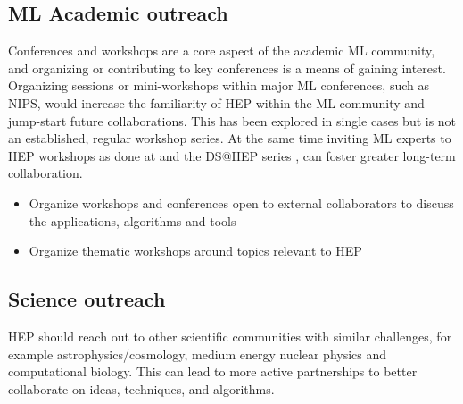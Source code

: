 

\subsection{ML Academic outreach}
Conferences and workshops are a core aspect of the academic ML community, and organizing or contributing to key conferences is a means of gaining interest. Organizing sessions or mini-workshops within major ML conferences, such as NIPS, would increase the familiarity of HEP within the ML community and jump-start future collaborations. This has been explored in single cases \cite{NIPS:2015:ALEPH} but is not an established, regular workshop series. At the same time inviting ML experts to HEP workshops as done at \cite{FlavourDataMining} and the DS@HEP series \cite{DSatHEP2015, DSatHEP2016, DSatHEP2017}, can foster greater long-term collaboration.

\begin{itemize}
 \item Organize workshops and conferences open to external collaborators to discuss the applications, algorithms and tools
 \item Organize thematic workshops around topics relevant to HEP
\end{itemize}

\subsection{Science outreach}
HEP should reach out to other scientific communities with similar challenges, for example astrophysics/cosmology, medium energy nuclear physics and computational biology. This can lead to more active partnerships to better collaborate on ideas, techniques, and algorithms.

